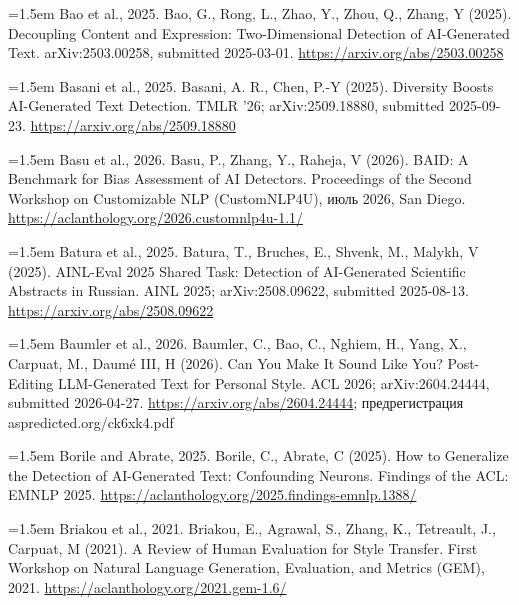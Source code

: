 \documentclass[11pt,a4paper]{article}
\renewcommand{\_}{\textunderscore\allowbreak}
\begin{document}
\noindent\hangindent=1.5em Bao et al., 2025. Bao, G., Rong, L., Zhao, Y., Zhou, Q., Zhang, Y (2025). Decoupling Content and Expression: Two-Dimensional Detection of AI-Generated Text. arXiv:2503.00258, submitted 2025-03-01. \url{https://arxiv.org/abs/2503.00258}\par\smallskip

\noindent\hangindent=1.5em Basani et al., 2025. Basani, A. R., Chen, P.-Y (2025). Diversity Boosts AI-Generated Text Detection. TMLR '26; arXiv:2509.18880, submitted 2025-09-23. \url{https://arxiv.org/abs/2509.18880}\par\smallskip

\noindent\hangindent=1.5em Basu et al., 2026. Basu, P., Zhang, Y., Raheja, V (2026). BAID: A Benchmark for Bias Assessment of AI Detectors. Proceedings of the Second Workshop on Customizable NLP (CustomNLP4U), \foreignlanguage{russian}{июль} 2026, San Diego. \url{https://aclanthology.org/2026.customnlp4u-1.1/}\par\smallskip

\noindent\hangindent=1.5em Batura et al., 2025. Batura, T., Bruches, E., Shvenk, M., Malykh, V (2025). AINL-Eval 2025 Shared Task: Detection of AI-Generated Scientific Abstracts in Russian. AINL 2025; arXiv:2508.09622, submitted 2025-08-13. \url{https://arxiv.org/abs/2508.09622}\par\smallskip

\noindent\hangindent=1.5em Baumler et al., 2026. Baumler, C., Bao, C., Nghiem, H., Yang, X., Carpuat, M., Daum\'e III, H (2026). Can You Make It Sound Like You? Post-Editing LLM-Generated Text for Personal Style. ACL 2026; arXiv:2604.24444, submitted 2026-04-27. \url{https://arxiv.org/abs/2604.24444}; \foreignlanguage{russian}{предрегистрация} aspredicted.org/ck6xk4.pdf\par\smallskip

\noindent\hangindent=1.5em Borile and Abrate, 2025. Borile, C., Abrate, C (2025). How to Generalize the Detection of AI-Generated Text: Confounding Neurons. Findings of the ACL: EMNLP 2025. \url{https://aclanthology.org/2025.findings-emnlp.1388/}\par\smallskip

\noindent\hangindent=1.5em Briakou et al., 2021. Briakou, E., Agrawal, S., Zhang, K., Tetreault, J., Carpuat, M (2021). A Review of Human Evaluation for Style Transfer. First Workshop on Natural Language Generation, Evaluation, and Metrics (GEM), 2021. \url{https://aclanthology.org/2021.gem-1.6/}\par\smallskip
\end{document}
